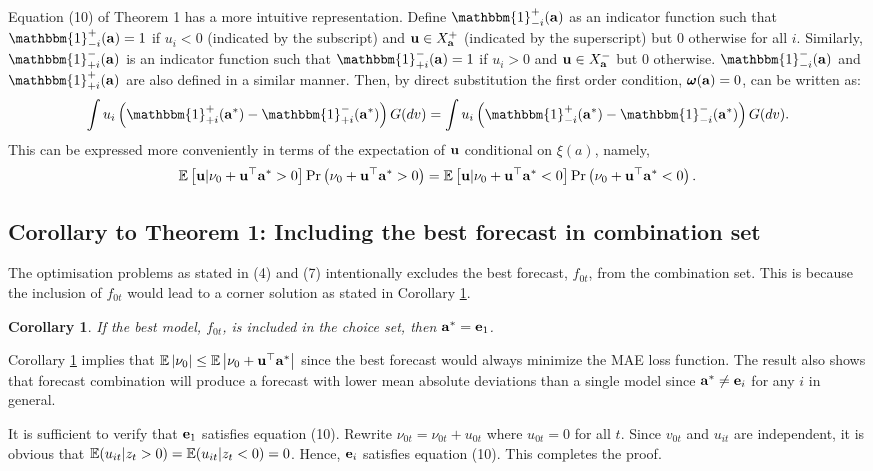 \documentclass[a4paper, 11pt]{article}
\newtheorem{coro}{Corollary}
\begin{document}
Equation (10) of Theorem 1 has a more intuitive representation. Define $\mathbbm{1}^+_{-i} (\bfa)$ as an indicator function such that $\mathbbm{1}^+_{-i} (\bfa) =1$ if $u_i<0$ (indicated by the subscript) and $\mathbf{u} \in X^+_{\mathbf{a}}$ (indicated by the superscript) but 0 otherwise for all $i$. Similarly, $\mathbbm{1}^-_{+i} (\bfa)$ is an indicator function such that $\mathbbm{1}^-_{+i} (\bfa)=1$ if $u_i>0$ and $\mathbf{u} \in X^-_{\mathbf{a}}$ but 0 otherwise. $\mathbbm{1}^-_{-i} (\bfa)$ and $\mathbbm{1}^+_{+i} (\bfa)$ are also defined in a similar manner. Then, by direct substitution the first order condition, $\pmb{\omega} (\mathbf{a}) = 0$, can be written as:
    \begin{equation*} 
	\int u_i \left ( \mathbbm{1}^+_{+i} (\bfa^*) - \mathbbm{1}^-_{+i} (\bfa^*) \right ) G(dv) = \int u_i \left ( \mathbbm{1}^+_{-i} (\bfa^*) - \mathbbm{1}^-_{-i} (\bfa^*) \right ) G(dv). 
    \end{equation*} 
    This can be expressed more conveniently in terms of the expectation of $\mathbf{u}$ conditional on $\xi(a)$, namely, 
    \begin{equation*} 
        \mathbb{E} \left [ \mathbf{u} | \nu_0 + \mathbf{u}^\top\mathbf{a}^* > 0 \right ] \text{Pr} \left ( \nu_0 + \mathbf{u}^\top\mathbf{a}^* > 0 \right ) = \mathbb{E} \left [ \mathbf{u} | \nu_0 + \mathbf{u}^\top\mathbf{a}^* < 0 \right ] \text{Pr} \left ( \nu_0 + \mathbf{u}^\top\mathbf{a}^* < 0 \right ).
    \end{equation*} 


\subsection{Corollary to Theorem 1: Including the best forecast in combination set}
   The optimisation problems as stated in (4) and (7) intentionally excludes the best forecast, $f_{0t}$, from the combination set. This is because the inclusion of $f_{0t}$ would lead to a corner solution as stated in Corollary \ref{col:best_model}. 
   \begin{coro} \label{col:best_model} 
      If the best model, $f_{0t}$, is included in the choice set, then $\mathbf{a}^* = \mathbf{e}_1$. 
   \end{coro}


\noindent Corollary \ref{col:best_model} implies that $\mathbb{E} \left | \nu_0 \right |\leq \mathbb{E} \left | \nu_0 + \mathbf{u}^\top\mathbf{a}^{*} \right |$ since the best forecast would always minimize the MAE loss function. The result also shows that forecast combination will produce a forecast with lower mean absolute deviations than a single model since $\mathbf{a}^* \neq \mathbf{e}_i$ for any $i$ in general.    
   \begin{proving} 
\noindent It is sufficient to verify that $\mathbf{e}_1$ satisfies equation (10). Rewrite $\nu_{0t} = \nu_{0t} + u_{0t}$ where $u_{0t} = 0$ for all $t$. Since $v_{0t}$ and $u_{it}$ are independent, it is obvious that $\mathbb{E} (u_{it} | z_t>0) = \mathbb{E} (u_{it} | z_t<0) = 0$. Hence, $\mathbf{e}_i$ satisfies equation (10). This completes the proof.  
   \end{proving}
\end{document}
